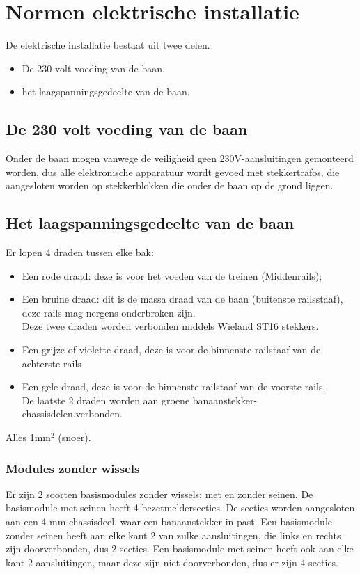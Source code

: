 \documentclass[12pt,a4paper]{report}
\begin{document}
\chapter{Normen elektrische installatie}
\label{ch:elektra}

De elektrische installatie bestaat uit twee delen.

\begin{itemize}
\item De 230 volt voeding van de baan.
\item het laagspanningsgedeelte van de baan.
\end{itemize}

\section{De 230 volt voeding van de baan}
Onder de baan mogen vanwege de veiligheid geen 230V-aansluitingen gemonteerd worden, dus alle elektronische apparatuur wordt gevoed met stekkertrafos, die aangesloten worden op stekkerblokken die onder de baan op de grond liggen.

\section{Het laagspanningsgedeelte van de baan}

Er lopen 4 draden tussen elke bak:
\begin{itemize}
\item Een rode draad: deze is voor het voeden van de treinen (Middenrails);
\item Een bruine draad: dit is de massa draad van de baan (buitenste railsstaaf), deze rails mag nergens onderbroken zijn.
\\
Deze twee draden worden verbonden middels Wieland ST16 stekkers.

\item Een grijze of violette draad, deze is voor de binnenste railstaaf van de achterste rails
\item Een gele draad, deze is voor de binnenste railstaaf van de voorste rails.\\
De laatste 2 draden worden aan groene banaanstekker-chassisdelen.verbonden.
\end{itemize}
Alles 1mm$^{2}$ (snoer). 

\subsection{Modules zonder wissels}
Er zijn 2 soorten basismodules zonder wissels: met en zonder seinen. De basismodule met seinen heeft 4 bezetmeldersecties.
De secties worden aangesloten aan een 4 mm chassisdeel, waar een banaanstekker in past.
Een basismodule zonder seinen heeft aan elke kant 2 van zulke aansluitingen, die links en rechts zijn doorverbonden, dus 2 secties.
Een basismodule met seinen heeft ook aan elke kant 2 aansluitingen, maar deze zijn niet doorverbonden, dus er zijn 4 secties.
\end{document}
